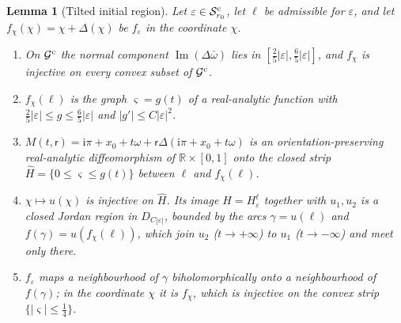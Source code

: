 \documentclass[11pt]{amsart}
\newtheorem{lemma}[theorem]{Lemma}
\theoremstyle{definition}
\newcommand{\ii}{\mathrm{i}}
\begin{document}
\begin{lemma}[Tilted initial region]\label{lem:crescent}
Let $\varepsilon\in\mathcal S^{\rm c}_{r_0}$, let $\ell$ be admissible for $\varepsilon$, and let
$f_\chi(\chi)=\chi+\Delta(\chi)$ be $f_\varepsilon$ in the coordinate $\chi$.
\begin{enumerate}
\item On $\mathcal G^{\rm c}$ the normal component
  $\operatorname{Im}(\Delta\bar\omega)$ lies in $[\tfrac25|\varepsilon|,\tfrac65|\varepsilon|]$, and $f_\chi$
  is injective on every convex subset of $\mathcal G^{\rm c}$.
\item $f_\chi(\ell)$ is the graph $\varsigma=g(t)$ of a real-analytic function with
  $\tfrac25|\varepsilon|\le g\le\tfrac65|\varepsilon|$ and $|g'|\le C|\varepsilon|^2$.
\item $M(t,\mathsf r)=\ii\pi+x_0+t\omega+\mathsf r\Delta(\ii\pi+x_0+t\omega)$ is an
  orientation-preserving real-analytic diffeomorphism of $\mathbb R\times[0,1]$
  onto the closed strip $\hat H=\{0\le\varsigma\le g(t)\}$ between $\ell$ and $f_\chi(\ell)$.
\item $\chi\mapsto u(\chi)$ is injective on $\hat H$.  Its image $H=H^\ell_\varepsilon$
  together with $u_1,u_2$ is a closed Jordan region in $D_{C|\varepsilon|}$, bounded by
  the arcs $\gamma=u(\ell)$ and $f(\gamma)=u(f_\chi(\ell))$, which join $u_2$
  ($t\to+\infty$) to $u_1$ ($t\to-\infty$) and meet only there.
\item $f_\varepsilon$ maps a neighbourhood of $\gamma$ biholomorphically onto a
  neighbourhood of $f(\gamma)$; in the coordinate $\chi$ it is $f_\chi$, which is
  injective on the convex strip $\{|\varsigma|\le\tfrac14\}$.
\end{enumerate}
\end{lemma}
\end{document}
